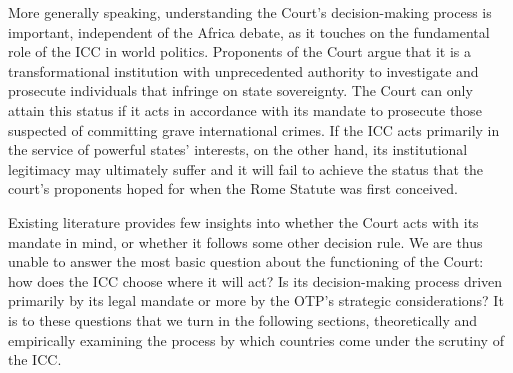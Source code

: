 More generally speaking, understanding the Court’s decision-making process is important, independent of the Africa debate, as it touches on the fundamental role of the ICC in world politics. Proponents of the Court argue that it is a transformational institution with unprecedented authority to investigate and prosecute individuals that infringe on state sovereignty. The Court can only attain this status if it acts in accordance with its mandate to prosecute those suspected of committing grave international crimes. If the ICC acts primarily in the service of powerful states’ interests, on the other hand, its institutional legitimacy may ultimately suffer and it will fail to achieve the status that the court’s proponents hoped for when the Rome Statute was first conceived. 

Existing literature provides few insights into whether the Court acts with its mandate in mind, or whether it follows some other decision rule. We are thus unable to answer the most basic question about the functioning of the Court: how does the ICC choose where it will act?  Is its decision-making process driven primarily by its legal mandate or more by the OTP’s strategic considerations? It is to these questions that we turn in the following sections, theoretically and empirically examining the process by which countries come under the scrutiny of the ICC. 
